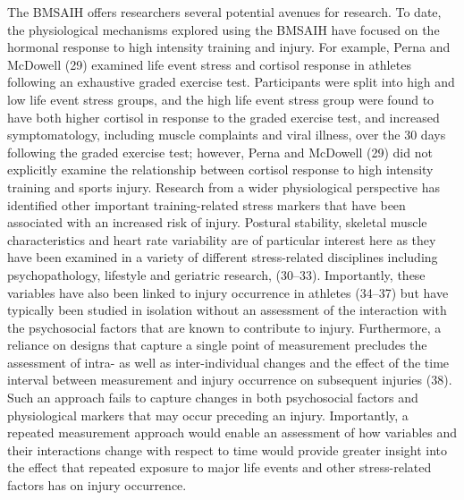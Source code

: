 \documentclass[
  english,
  man]{apa6}
\begin{document}
The BMSAIH offers researchers several potential avenues for research.
To date, the physiological mechanisms explored using the BMSAIH have focused on the hormonal response to high intensity training and injury.
For example, Perna and McDowell (29) examined life event stress and cortisol response in athletes following an exhaustive graded exercise test.
Participants were split into high and low life event stress groups, and the high life event stress group were found to have both higher cortisol in response to the graded exercise test, and increased symptomatology, including muscle complaints and viral illness, over the 30 days following the graded exercise test; however, Perna and McDowell (29) did not explicitly examine the relationship between cortisol response to high intensity training and sports injury.
Research from a wider physiological perspective has identified other important training-related stress markers that have been associated with an increased risk of injury.
Postural stability, skeletal muscle characteristics and heart rate variability are of particular interest here as they have been examined in a variety of different stress-related disciplines including psychopathology, lifestyle and geriatric research, (30--33).
Importantly, these variables have also been linked to injury occurrence in athletes (34--37) but have typically been studied in isolation without an assessment of the interaction with the psychosocial factors that are known to contribute to injury.
Furthermore, a reliance on designs that capture a single point of measurement precludes the assessment of intra- as well as inter-individual changes and the effect of the time interval between measurement and injury occurrence on subsequent injuries (38).
Such an approach fails to capture changes in both psychosocial factors and physiological markers that may occur preceding an injury.
Importantly, a repeated measurement approach would enable an assessment of how variables and their interactions change with respect to time would provide greater insight into the effect that repeated exposure to major life events and other stress-related factors has on injury occurrence.
\end{document}
